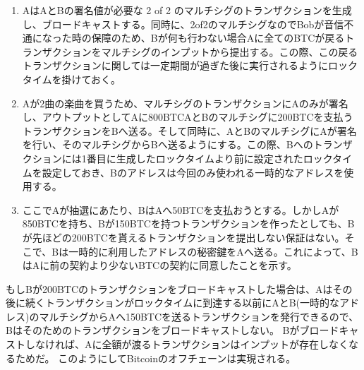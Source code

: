 \begin{enumerate}
\item AはAとBの署名値が必要な 2 of 2 のマルチシグのトランザクションを生成し、ブロードキャストする。同時に、2of2のマルチシグなのでBobが音信不通になった時の保障のため、Bが何も行わない場合Aに全てのBTCが戻るトランザクションをマルチシグのインプットから提出する。この際、この戻るトランザクションに関しては一定期間が過ぎた後に実行されるようにロックタイムを掛けておく。
\item Aが2曲の楽曲を買うため、マルチシグのトランザクションにAのみが署名し、アウトプットとしてAに800BTCAとBのマルチシグに200BTCを支払うトランザクションをBへ送る。そして同時に、AとBのマルチシグにAが署名を行い、そのマルチシグからBへ送るようにする。この際、Bへのトランザクションには1番目に生成したロックタイムより前に設定されたロックタイムを設定しておき、Bのアドレスは今回のみ使われる一時的なアドレスを使用する。
\item ここでAが抽選にあたり、BはAへ50BTCを支払おうとする。しかしAが850BTCを持ち、Bが150BTCを持つトランザクションを作ったとしても、Bが先ほどの200BTCを貰えるトランザクションを提出しない保証はない。そこで、Bは一時的に利用したアドレスの秘密鍵をAへ送る。これによって、BはAに前の契約より少ないBTCの契約に同意したことを示す。
\end{enumerate}
もしBが200BTCのトランザクションをブロードキャストした場合は、Aはその後に続くトランザクションがロックタイムに到達する以前にAとB(一時的なアドレス)のマルチシグからAへ150BTCを送るトランザクションを発行できるので、Bはそのためのトランザクションをブロードキャストしない。
Bがブロードキャストしなければ、Aに全額が渡るトランザクションはインプットが存在しなくなるためだ。
このようにしてBitcoinのオフチェーンは実現される。